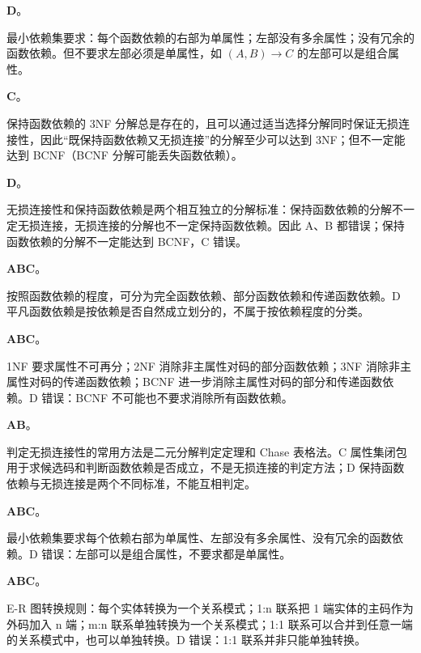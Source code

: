 \documentclass[a4paper,11pt]{article}
\begin{document}
\q \textbf{D}。\begin{analysis}最小依赖集要求：每个函数依赖的右部为单属性；左部没有多余属性；没有冗余的函数依赖。但不要求左部必须是单属性，如 $(A,B)\to C$ 的左部可以是组合属性。\end{analysis}

\q \textbf{C}。\begin{analysis}保持函数依赖的 3NF 分解总是存在的，且可以通过适当选择分解同时保证无损连接性，因此“既保持函数依赖又无损连接”的分解至少可以达到 3NF；但不一定能达到 BCNF（BCNF 分解可能丢失函数依赖）。\end{analysis}

\q \textbf{D}。\begin{analysis}无损连接性和保持函数依赖是两个相互独立的分解标准：保持函数依赖的分解不一定无损连接，无损连接的分解也不一定保持函数依赖。因此 A、B 都错误；保持函数依赖的分解不一定能达到 BCNF，C 错误。\end{analysis}


\q \textbf{ABC}。\begin{analysis}按照函数依赖的程度，可分为完全函数依赖、部分函数依赖和传递函数依赖。D 平凡函数依赖是按依赖是否自然成立划分的，不属于按依赖程度的分类。\end{analysis}

\q \textbf{ABC}。\begin{analysis}1NF 要求属性不可再分；2NF 消除非主属性对码的部分函数依赖；3NF 消除非主属性对码的传递函数依赖；BCNF 进一步消除主属性对码的部分和传递函数依赖。D 错误：BCNF 不可能也不要求消除所有函数依赖。\end{analysis}

\q \textbf{AB}。\begin{analysis}判定无损连接性的常用方法是二元分解判定定理和 Chase 表格法。C 属性集闭包用于求候选码和判断函数依赖是否成立，不是无损连接的判定方法；D 保持函数依赖与无损连接是两个不同标准，不能互相判定。\end{analysis}

\q \textbf{ABC}。\begin{analysis}最小依赖集要求每个依赖右部为单属性、左部没有多余属性、没有冗余的函数依赖。D 错误：左部可以是组合属性，不要求都是单属性。\end{analysis}

\q \textbf{ABC}。\begin{analysis}E-R 图转换规则：每个实体转换为一个关系模式；1:n 联系把 1 端实体的主码作为外码加入 n 端；m:n 联系单独转换为一个关系模式；1:1 联系可以合并到任意一端的关系模式中，也可以单独转换。D 错误：1:1 联系并非只能单独转换。\end{analysis}
\end{document}
